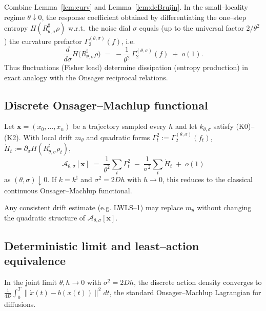 		\begin{corollary}\label{cor:FDT}
			Combine Lemma~\ref{lem:curv} and Lemma~\ref{lem:deBruijn}.
			In the small--locality regime $\theta\downarrow0$,
			the response coefficient obtained by differentiating the
			one--step entropy $H(R^{\sharp}_{\theta,\sigma}\rho)$ w.r.t.\ the
			noise dial $\sigma$ equals (up to the universal factor $2/\theta^{2}$)
			the curvature prefactor $\Gamma_{2}^{(\theta,\sigma)}(f)$, i.e.
			\[
  				\frac{d}{d\sigma}H\bigl(R^{\sharp}_{\theta,\sigma}\rho\bigr)
  				\;=\;
  				-\frac{1}{\theta^{2}}\,
   				\Gamma_{2}^{(\theta,\sigma)}(f)
  				\;+\; o(1).
			\]
			Thus fluctuations (Fisher load) determine dissipation (entropy
			production) in exact analogy with the Onsager reciprocal relations.
		\end{corollary}
		
	\subsection{Discrete Onsager--Machlup functional}\label{subsec:OM}
		\begin{corollary}\label{cor:action}
			Let $\mathbf x=(x_0,\dots,x_n)$ be a trajectory sampled every $h$ and
			let $k_{\theta,\sigma}$ satisfy \textnormal{(K0)--(K2)}.
			With local drift $m_\theta$ and quadratic forms
			$\Gamma_t^{2}:=\Gamma^{(\theta,\sigma)}_2(f_t)$,
			$\dot H_t:=\partial_\sigma H(R^{\sharp}_{\theta,\sigma}\rho_t)$,
			\[
  				\mathcal A_{\theta,\sigma}[\mathbf x]
				\;=\;
    				\frac{1}{\theta^{2}}\sum_{t}\Gamma_t^{2}
   				\;-\;
    				\frac{1}{\sigma^{2}}\sum_{t}\dot H_t
    				\;+\; o(1)
			\]
			as $(\theta,\sigma)\!\downarrow0$.  If $k=k^{\natural}$ and
			$\sigma^{2}=2Dh$ with $h\to0$, this reduces to the classical
			continuous Onsager--Machlup functional.
		\end{corollary}

		\begin{remark}\label{rem:datadrivenOM}
			Any consistent drift estimate (e.g. LWLS–1) may replace $m_\theta$
			without changing the quadratic structure of
			$\mathcal A_{\theta,\sigma}[\mathbf x]$.
		\end{remark}


	\subsection{Deterministic limit and least–action equivalence}
		\begin{remark}\label{rem:classical_L}
			In the joint limit $\theta,h\to0$ with $\sigma^{2}=2Dh$, the discrete
			action density converges to
			$\tfrac{1}{4D}\!\int_{0}^{T}\|\dot x(t)-b(x(t))\|^{2}dt$,
			the standard Onsager–Machlup Lagrangian for diffusions.
		\end{remark}

